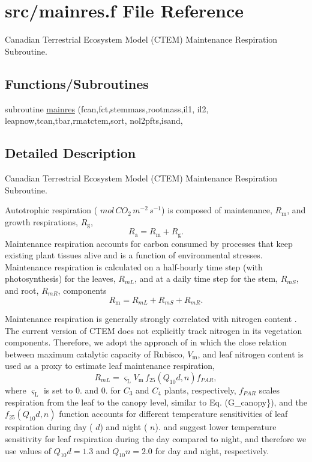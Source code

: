 \hypertarget{mainres_8f}{}\section{src/mainres.f File Reference}
\label{mainres_8f}


Canadian Terrestrial Ecosystem Model (C\+T\+E\+M) Maintenance Respiration Subroutine.  


\subsection*{Functions/\+Subroutines}
\begin{DoxyCompactItemize}
\item 
subroutine \hyperlink{mainres_8f_a86c41356a868e2ef9d08ffb14f45aff5}{mainres} (fcan,fct,stemmass,rootmass,il1, il2, leapnow,tcan,tbar,rmatctem,sort, nol2pfts,isand,
\end{DoxyCompactItemize}


\subsection{Detailed Description}
Canadian Terrestrial Ecosystem Model (C\+T\+E\+M) Maintenance Respiration Subroutine. 

Autotrophic respiration ( $mol\,CO_2\,m^{-2}\,s^{-1}$) is composed of maintenance, $R_\mathrm{m}$, and growth respirations, $R_\mathrm{g}$, \[ R_\mathrm{a} =R_\mathrm{m} + R_\mathrm{g}. \] Maintenance respiration accounts for carbon consumed by processes that keep existing plant tissues alive and is a function of environmental stresses. Maintenance respiration is calculated on a half-\/hourly time step (with photosynthesis) for the leaves, $R_{mL}$, and at a daily time step for the stem, $R_{mS}$, and root, $R_{mR}$, components \[ \label{mainres_all} R_\mathrm{m} = R_{mL} + R_{mS} + R_{mR}. \]

Maintenance respiration is generally strongly correlated with nitrogen content \cite{Reich1998-zr} \cite{Ryan1991-ai}. The current version of C\+T\+E\+M does not explicitly track nitrogen in its vegetation components. Therefore, we adopt the approach of \cite{Collatz1991-5bc} \cite{Collatz1992-jf} in which the close relation between maximum catalytic capacity of Rubisco, $V_\mathrm{m}$, and leaf nitrogen content is used as a proxy to estimate leaf maintenance respiration, \[ R_{mL} = \varsigma_\mathrm{L}V_\mathrm{m}\,f_{25}(Q_10d,n)f_{PAR}, \] where $\varsigma_\mathrm{L}$ is set to 0. and 0. for $C_3$ and $C_4$ plants, respectively, $f_{PAR}$ scales respiration from the leaf to the canopy level, similar to Eq. (G\+\_\+canopy\}), and the $f_{25}(Q_10d,n)$ function accounts for different temperature sensitivities of leaf respiration during day ( $d$) and night ( $n$). \cite{Pons2003-f26} and \cite{Xu2003-d75} suggest lower temperature sensitivity for leaf respiration during the day compared to night, and therefore we use values of $Q_10d=1.3$ and $Q_10n=2.0$ for day and night, respectively.


